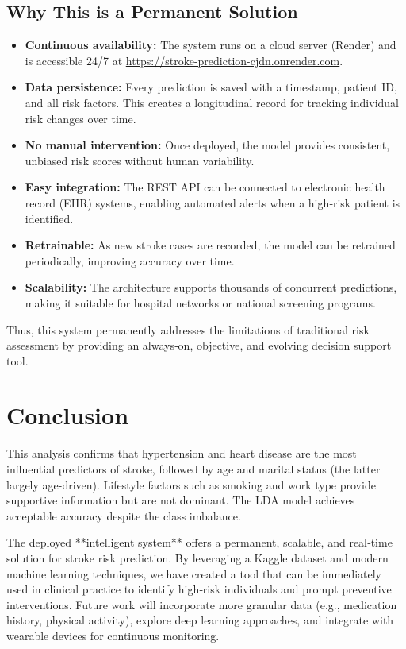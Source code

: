 \documentclass[12pt,a4paper]{article}
\begin{document}
\subsection{Why This is a Permanent Solution}
\begin{itemize}
    \item \textbf{Continuous availability:} The system runs on a cloud server (Render) and is accessible 24/7 at \url{https://stroke-prediction-cjdn.onrender.com}.
    \item \textbf{Data persistence:} Every prediction is saved with a timestamp, patient ID, and all risk factors. This creates a longitudinal record for tracking individual risk changes over time.
    \item \textbf{No manual intervention:} Once deployed, the model provides consistent, unbiased risk scores without human variability.
    \item \textbf{Easy integration:} The REST API can be connected to electronic health record (EHR) systems, enabling automated alerts when a high‑risk patient is identified.
    \item \textbf{Retrainable:} As new stroke cases are recorded, the model can be retrained periodically, improving accuracy over time.
    \item \textbf{Scalability:} The architecture supports thousands of concurrent predictions, making it suitable for hospital networks or national screening programs.
\end{itemize}
Thus, this system permanently addresses the limitations of traditional risk assessment by providing an always‑on, objective, and evolving decision support tool.

\section{Conclusion}
This analysis confirms that hypertension and heart disease are the most influential predictors of stroke, followed by age and marital status (the latter largely age-driven). Lifestyle factors such as smoking and work type provide supportive information but are not dominant. The LDA model achieves acceptable accuracy despite the class imbalance. 

The deployed **intelligent system** offers a permanent, scalable, and real‑time solution for stroke risk prediction. By leveraging a Kaggle dataset and modern machine learning techniques, we have created a tool that can be immediately used in clinical practice to identify high‑risk individuals and prompt preventive interventions. Future work will incorporate more granular data (e.g., medication history, physical activity), explore deep learning approaches, and integrate with wearable devices for continuous monitoring.
\end{document}
